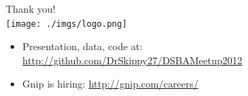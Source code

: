\documentclass{beamer}
\begin{document}

\begin{frame}
  \begin{center}
    {\Large Thank you!}  \\ [20pt]
    \texttt{[image: ./imgs/logo.png]} \\ [15pt]
    \begin{itemize}
    \item Presentation, data, code at: \url{http://github.com/DrSkippy27/DSBAMeetup2012}
    \item Gnip is hiring: \url{http://gnip.com/careers/}
    \end{itemize}
  \end{center}
\end{frame}
\end{document}
